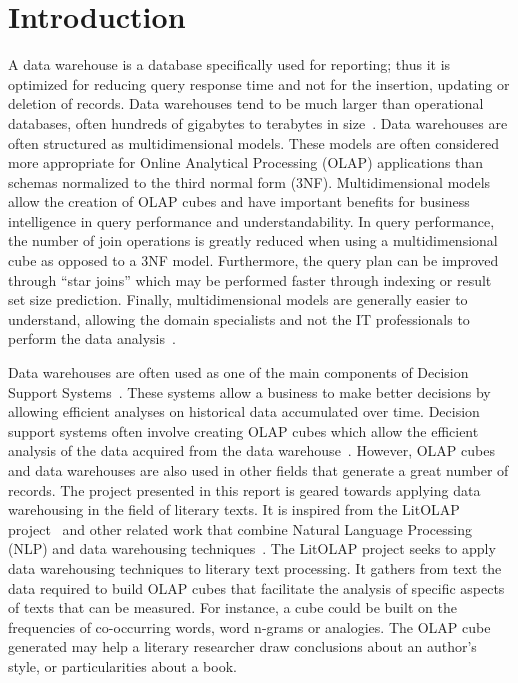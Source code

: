 \section{Introduction} %

A data warehouse is a database specifically used for reporting; thus it is optimized for reducing query response time and not for the insertion, updating or
deletion of records. Data warehouses tend to be much larger than operational databases, often hundreds of gigabytes to terabytes in
size~\cite{chau:db-tech-dss}. Data warehouses are often structured as multidimensional models. These models are often considered more appropriate for Online
Analytical Processing (OLAP) applications than schemas normalized to the third normal form (3NF). Multidimensional models allow the creation of OLAP cubes and
have important benefits for business intelligence in query performance and understandability. In query performance, the number of join operations is greatly
reduced when using a multidimensional cube as opposed to a 3NF model. Furthermore, the query plan can be improved through ``star joins'' which may be performed
faster through indexing or result set size prediction. Finally, multidimensional models are generally easier to understand, allowing the domain specialists and
not the IT professionals to perform the data analysis~\cite{KaserKeithLemire2006}.

Data warehouses are often used as one of the main components of Decision Support Systems~\cite{chau:db-tech-dss}. These systems allow a business to make better
decisions by allowing efficient analyses on historical data accumulated over time. Decision support systems often involve creating OLAP cubes which allow the
efficient analysis of the data acquired from the data warehouse~\cite{pede:md-db-tech}. However, OLAP cubes and data warehouses are also used in other fields
that generate a great number of records. The project presented in this report is geared towards applying data warehousing in the field of literary texts. It is
inspired from the LitOLAP project~\cite{KaserKeithLemire2006} and other related work that combine Natural Language Processing (NLP) and data warehousing
techniques~\cite{inok:OLAP-text-cikm07,text-mining-survey-sigmod07, pere:integratingDW}. The LitOLAP project seeks to apply data warehousing techniques to
literary text processing. It gathers from text the data required to build OLAP cubes that facilitate the analysis of specific aspects of texts that can be
measured. For instance, a cube could be built on the frequencies of co-occurring words, word n-grams or analogies. The OLAP cube generated may help a literary
researcher draw conclusions about an author’s style, or particularities about a book.

